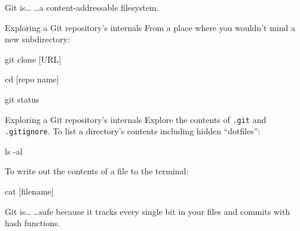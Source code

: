 \begin{frame}{Git is\ldots}
  \hangindent=30pt \Huge {
  \ldots a content-addressable filesystem.
  }
\end{frame}

\begin{frame}[fragile]{Exploring a Git repository's internals}
  From a place where you wouldn't mind a new subdirectory:

  \begin{gitCommand}git clone [URL]\end{gitCommand}

  \begin{gitCommand}cd [repo name]\end{gitCommand}

  \begin{gitCommand}git status\end{gitCommand}

\end{frame}

\begin{frame}[fragile]{Exploring a Git repository's internals}
  Explore the contents of \texttt{.git} and \texttt{.gitignore}. To
  list a directory's contents including hidden ``dotfiles'':

  \begin{gitCommand}ls -al\end{gitCommand}

  To write out the contents of a file to the terminal:

  \begin{gitCommand}cat [filename]\end{gitCommand}

\end{frame}

\begin{frame}{Git is\ldots}
  \hangindent=30pt \Huge {
  \ldots safe because it tracks every single bit in your files and commits with
  hash functions.
  }
\end{frame}

